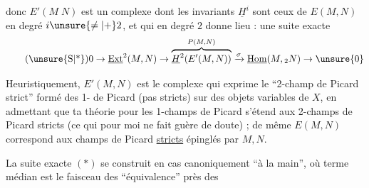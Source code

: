 \margin{\mbox{-- --}}

donc $E'(M\;N)$ est un complexe dont les invariants $\underline{H}^{i}$ sont ceux de $E(M,N)$ en degré $i\unsure{\ne|+}2$, et qui en degré $2$ donne lieu : une suite exacte
\begingroup
\makeatletter\tagsleft@true\makeatother
\[
\tag*{(\unsure{S|*})}
0\to\underline{\mathrm{Ext}}^{2}(M,N)\to
\overbrace{\underline{H}^{2}\!\left(E'(M,N)\right)}^{P(M,N)}
\xrightarrow{\sigma}\underline{\mathrm{Hom}}(M,{}_{2}N)\to \unsure{0}
\]
\endgroup

Heuristiquement, $E'(M,N)$ est le complexe qui exprime le ``2-champ de Picard strict'' formé des 1- de Picard (pas  stricts)  sur des objets variables de $X$, en admettant que ta théorie pour les 1-champs de Picard  s'étend aux 2-champs de Picard stricts (ce qui pour  moi ne fait guère de doute) ; de même $E(M,N)$ correspond aux champs de Picard \uline{stricts} épinglés par $M,N$.

La suite exacte $(*)$ se construit en  cas canoniquement ``à la main'', où  terme médian est le faisceau des   ``équivalence'' près des

